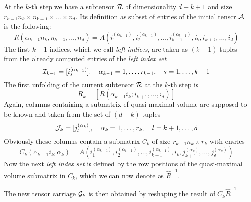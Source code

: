 At the $k$-th step we have a subtensor $\mathcal{R}$ of dimensionality $d-k+1$ and size $r_{k-1}n_k \times n_{k+1} \times \ldots \times n_d$. Its definition as subset of entries of the initial tensor $\mathcal{A}$ is the following:
\begin{equation*}
  R(\alpha_{k-1}n_k,n_{k+1},\ldots,n_d) = A(i_1^{(\alpha_{k-1})},i_2^{(\alpha_{k-1})},\ldots,i_{k-1}^{(\alpha_{k-1})},i_k,i_{k+1},\ldots,i_d)
\end{equation*}
The first $k-1$ indices, which we call \emph{left indices}, are taken as $(k-1)$-tuples from the already computed entries of the \emph{left index set}
\begin{equation*}
  \mathcal{I}_{k-1} = [i_s^{(\alpha_{k-1})}],\quad \alpha_{k-1} = 1,\ldots,r_{k-1},\quad s = 1,\ldots,k-1
\end{equation*}
The first unfolding of the current subtensor $\mathcal{R}$ at the $k$-th step is
\begin{equation*}
  R_k = [R(\alpha_{k-1}i_k;i_{k+1},\ldots,i_d)]
\end{equation*}
Again, columns containing a submatrix of quasi-maximal volume are supposed to be known and taken from the set of $(d-k)$-tuples
\begin{equation*}
  \mathcal{J}_k = [j_l^{(\alpha_k)}],\quad \alpha_k = 1,\ldots,r_k,\quad l = k+1,\ldots,d
\end{equation*}
Obviously these columns contain a submatrix $C_k$ of size $r_{k-1}n_k \times r_k$ with entries
\begin{equation*}
  C_k(\alpha_{k-1}i_k,\alpha_k) = A(i_1^{(\alpha_{k-1})},i_2^{(\alpha_{k-1})},\ldots,i_{k-1}^{(\alpha_{k-1})},i_k,j_{k+1}^{(\alpha_k)},\ldots,j_d^{(\alpha_k)})
\end{equation*}
Now the next \emph{left index set} is defined by the row positions of the quasi-maximal volume submatrix in $C_k$, which we can now denote as $\hat{R}^{-1}$.

The new tensor carriage $\mathcal{G}_k$ is then obtained by reshaping the result of $C_k \hat{R}^{-1}$

